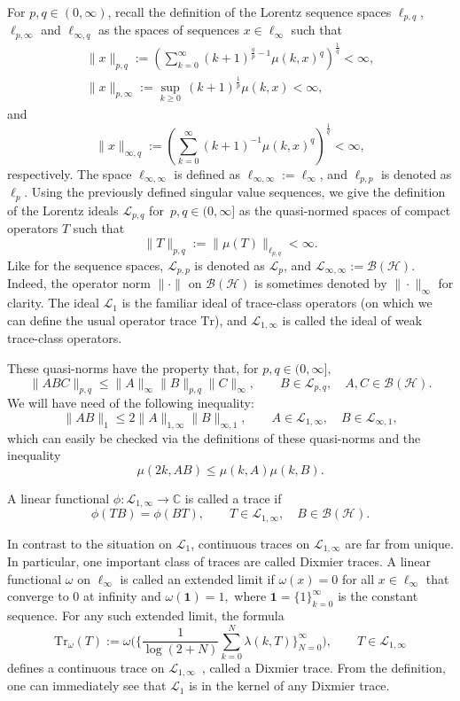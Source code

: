 \documentclass[pdftex]{sigma}
\numberwithin{equation}{section}
\begin{document}
For $p,q\in (0,\infty)$, recall the definition of the Lorentz sequence spaces $\ell_{p,q}$, $\ell_{p,\infty}$ and $\ell_{\infty, q}$ as the spaces of sequences $x\in \ell_\infty$ such that
\begin{gather*}
\| x \|_{p,q} := \left( \sum_{k=0}^\infty (k+1)^{\frac{q}{p}-1} \mu(k,x)^q \right)^{\frac{1}{q}}<\infty,
\\
\| x \|_{p, \infty} := \sup_{k\geq 0}\, (k+1)^{\frac{1}{p}} \mu(k,x) <\infty,
\end{gather*}
and
\[
\| x \|_{\infty, q} := \left( \sum_{k=0}^\infty (k+1)^{-1} \mu(k,x)^q \right)^{\frac{1}{q}}<\infty,
\]
respectively. The space $\ell_{\infty, \infty}$ is defined as $\ell_{\infty, \infty} := \ell_\infty$, and $\ell_{p,p}$ is denoted as $\ell_p$. Using the previously defined singular value sequences, we give the definition of the Lorentz ideals $\mathcal{L}_{p,q}$ for~$p,q \in (0,\infty]$ as the quasi-normed spaces of compact operators $T$ such that
\[
\|T\|_{p,q} := \| \mu(T)\|_{\ell_{p,q}} <\infty.
\]
Like for the sequence spaces, $\mathcal{L}_{p,p}$ is denoted as $\mathcal{L}_p$, and $\mathcal{L}_{\infty, \infty} := \mathcal{B}(\mathcal{H})$. Indeed, the operator norm $\| \cdot \|$ on $\mathcal{B}(\mathcal{H})$ is sometimes denoted by $\| \cdot \|_\infty$ for clarity. The ideal $\mathcal{L}_1$ is the familiar ideal of trace-class operators (on which we can define the usual operator trace $\mathrm{Tr}$), and $\mathcal{L}_{1,\infty}$ is called the ideal of weak trace-class operators.

These quasi-norms have the property that, for $p,q \in (0,\infty],$
\[
\|ABC\|_{p,q} \leq \|A\|_{\infty} \|B\|_{p,q} \|C\|_{\infty}, \qquad B \in \mathcal{L}_{p,q}, \quad A, C \in \mathcal{B}(\mathcal{H}).
\]
We will have need of the following inequality:
\[
\|AB\|_{1} \leq 2\|A\|_{1,\infty} \|B\|_{\infty,1}, \qquad A \in \mathcal{L}_{1,\infty}, \quad B \in \mathcal{L}_{\infty, 1},
\]
which can easily be checked via the definitions of these quasi-norms and the inequality
\[
\mu(2k,AB)\leq \mu(k,A)\mu(k,B).
\]

A linear functional $\phi\colon \mathcal{L}_{1,\infty} \to \mathbb{C}$ is called a trace if
\[
\phi(TB) = \phi(BT), \qquad T\in \mathcal{L}_{1,\infty},\quad B\in \mathcal{B}(\mathcal{H}).
\]

In contrast to the situation on $\mathcal{L}_1$, continuous traces on $\mathcal{L}_{1,\infty}$ are far from unique. In particular, one important class of traces are called Dixmier traces. A linear functional $\omega$ on $\ell_{\infty}$ is called an extended limit if $\omega(x) = 0$ for all $x\in \ell_\infty$ that converge to $0$ at infinity and $\omega(\mathbf{1}) = 1,$ where $\mathbf{1} = \{1\}_{k=0}^\infty$ is the constant sequence. For any such extended limit, the formula
\[
\mathrm{Tr}_\omega(T) := \omega \Bigg( \Bigg \{ \frac{1}{\log(2+N)} \sum_{k=0}^N \lambda(k,T)\Bigg \}_{N=0}^\infty\Bigg), \qquad T\in \mathcal{L}_{1,\infty}
\]
defines a continuous trace on $\mathcal{L}_{1,\infty}$~\cite[Theorem 6.1.2]{LSZVol1}, called a Dixmier trace. From the definition, one can immediately see that $\mathcal{L}_1$ is in the kernel of any Dixmier trace.
\end{document}
